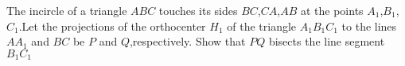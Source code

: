 The incircle of a triangle $ABC$ touches its sides $BC$,$CA$,$AB$ at the points $A_1$,$B_1$,$C_1$.Let the projections of the orthocenter $H_1$ of the triangle $A_{1}B_{1}C_{1}$ to the lines $AA_1$ and $BC$ be $P$ and $Q$,respectively. Show that $PQ$ bisects the line segment $B_{1}C_{1}$
